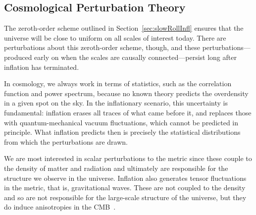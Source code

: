 \subsection{Cosmological Perturbation Theory}
\label{sec:cosmological_perturbation_theory}
The zeroth-order scheme outlined
in Section~\ref{sec:slowRollInfl} ensures that the universe will be close to uniform on all scales of
interest today. There are perturbations about this zeroth-order scheme, though, and these
perturbations—produced early on when the scales are causally connected—persist long
after inflation has terminated.

In cosmology, we always work in terms of statistics, such as the correlation function
and power spectrum, because no known theory predicts the overdensity in a given spot
on the sky. In the inflationary scenario, this uncertainty is fundamental: inflation erases all
traces of what came before it, and replaces those with quantum-mechanical vacuum fluctuations, 
which cannot be predicted in principle. What inflation predicts then is precisely
the statistical distributions from which the perturbations are drawn.

We are most interested in scalar perturbations to the metric since these couple to the
density of matter and radiation and ultimately are responsible for the structure we observe
in the universe. Inflation also generates tensor fluctuations in the metric, that is, gravitational
waves. These are not coupled to the density and so are not responsible for the large-scale structure 
of the universe, but they do induce anisotropies in the
CMB~\cite{ModernCosm}.

